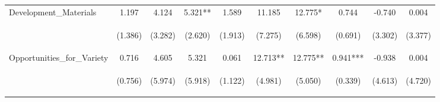 \begin{tabular}{lccccccccc}
\noalign{\smallskip}Development_Materials & 1.197 & 4.124 & 5.321** & 1.589 & 11.185 & 12.775* & 0.744 & -0.740 & 0.004\\
 & \begin{footnotesize}(1.386)\end{footnotesize} & \begin{footnotesize}(3.282)\end{footnotesize} & \begin{footnotesize}(2.620)\end{footnotesize} & \begin{footnotesize}(1.913)\end{footnotesize} & \begin{footnotesize}(7.275)\end{footnotesize} & \begin{footnotesize}(6.598)\end{footnotesize} & \begin{footnotesize}(0.691)\end{footnotesize} & \begin{footnotesize}(3.302)\end{footnotesize} & \begin{footnotesize}(3.377)\end{footnotesize}\\
\noalign{\smallskip}Opportunities_for_Variety & 0.716 & 4.605 & 5.321 & 0.061 & 12.713** & 12.775** & 0.941*** & -0.938 & 0.004\\
 & \begin{footnotesize}(0.756)\end{footnotesize} & \begin{footnotesize}(5.974)\end{footnotesize} & \begin{footnotesize}(5.918)\end{footnotesize} & \begin{footnotesize}(1.122)\end{footnotesize} & \begin{footnotesize}(4.981)\end{footnotesize} & \begin{footnotesize}(5.050)\end{footnotesize} & \begin{footnotesize}(0.339)\end{footnotesize} & \begin{footnotesize}(4.613)\end{footnotesize} & \begin{footnotesize}(4.720)\end{footnotesize}\\

\end{tabular}
